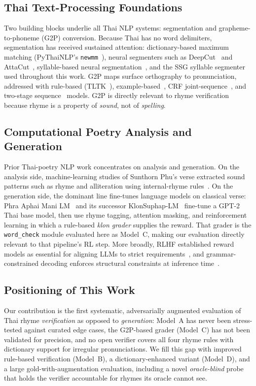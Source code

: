 \documentclass[conference]{IEEEtran}
\begin{document}
\subsection{Thai Text-Processing Foundations}

Two building blocks underlie all Thai NLP systems: segmentation and
grapheme-to-phoneme (G2P) conversion. Because Thai has no word delimiters,
segmentation has received sustained attention: dictionary-based maximum
matching (PyThaiNLP's \texttt{newmm}~\cite{pythainlp}), neural segmenters
such as DeepCut~\cite{deepcut} and AttaCut~\cite{attacut},
syllable-based neural segmentation~\cite{chormai2020syllable}, and the SSG
syllable segmenter used throughout this work. G2P maps surface orthography
to pronunciation, addressed with rule-based (TLTK~\cite{tltk}),
example-based~\cite{charoenpornsawat2006}, CRF joint-sequence~\cite{saychum2016},
and two-stage sequence~\cite{rugchatjaroen2019} models. G2P is directly
relevant to rhyme verification because rhyme is a property of \emph{sound},
not of \emph{spelling}.

\subsection{Computational Poetry Analysis and Generation}

Prior Thai-poetry NLP work concentrates on analysis and generation. On the
analysis side, machine-learning studies of Sunthorn Phu's verse extracted
sound patterns such as rhyme and alliteration using internal-rhyme
rules~\cite{suksanguan2021}. On the generation side, the dominant line
fine-tunes language models on classical verse: Phra Aphai Mani
LM~\cite{phraaphai} and its successor KlonSuphap-LM~\cite{klonsuphap}
fine-tune a GPT-2 Thai base model, then use rhyme tagging, attention
masking, and reinforcement learning in which a rule-based \emph{klon
grader} supplies the reward. That grader is the \texttt{word\_check} module
evaluated here as Model~C, making our evaluation directly relevant to that
pipeline's RL step. More broadly, RLHF established reward models as
essential for aligning LLMs to strict requirements~\cite{ouyang2022}, and
grammar-constrained decoding enforces structural constraints at inference
time~\cite{geng2023}.

\subsection{Positioning of This Work}

Our contribution is the first systematic, adversarially augmented
evaluation of Thai rhyme \emph{verification} as opposed to
\emph{generation}: Model~A has never been stress-tested against curated
edge cases, the G2P-based grader (Model~C) has not been validated for
precision, and no open verifier covers all four rhyme rules with dictionary
support for irregular pronunciations. We fill this gap with improved
rule-based verification (Model~B), a dictionary-enhanced variant (Model~D),
and a large gold-with-augmentation evaluation, including a novel
\emph{oracle-blind} probe that holds the verifier accountable for rhymes
its oracle cannot see.
\end{document}
